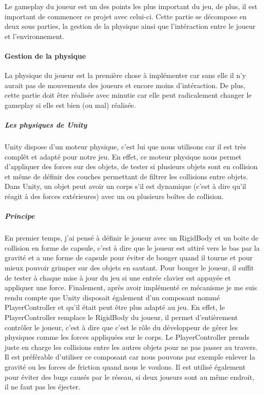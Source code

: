 \documentclass{article}
\begin{document}
Le gameplay du joueur est un des points les plus important du jeu, de plus, il est important de commencer ce projet avec celui-ci. Cette partie se décompose en deux sous parties, la gestion de la physique ainsi que l'intéraction entre le joueur et l'environnement.

\paragraph{Gestion de la physique}

La physique du joueur est la première chose à implémenter car sans elle il n'y aurait pas de mouvements des joueurs et encore moins d'intéraction.
De plus, cette partie doit être réalisée avec minutie car elle peut radicalement changer le gameplay si elle est bien (ou mal) réalisée.

\subparagraph{Les physiques de Unity}

Unity dispose d'un moteur physique, c'est lui que nous utilisons car il est très complêt et adapté pour notre jeu. En effet, ce moteur physique nous permet d'appliquer des forces sur des objets, de tester si plusieurs objets sont en collision et même de définir des couches permettant de filtrer les collisions entre objets. Dans Unity, un objet peut avoir un corps s'il est dynamique (c'est à dire qu'il réagit à des forces extérieures) avec un ou plusieurs boîtes de collision.

\subparagraph{Principe}

En premier temps, j'ai pensé à définir le joueur avec un RigidBody et un boite de collision en forme de capsule, c'est à dire que le joueur est attiré vers le bas par la gravité et a une forme de capsule pour éviter de bouger quand il tourne et pour mieux pouvoir grimper sur des objets en sautant. Pour bouger le joueur, il suffit de tester à chaque mise à jour du jeu si une entrée clavier est appuyée et appliquer une force. Finalement, après avoir implémenté ce mécanisme je me suis rendu compte que Unity disposait également d'un composant nommé PlayerController et qu'il était peut être plus adapté au jeu. En effet, le PlayerController remplace le RigidBody du joueur, il permet d'entièrement contrôler le joueur, c'est à dire que c'est le rôle du développeur de gérer les physiques comme les forces appliquées sur le corps. Le PlayerController prends juste en charge les collisions entre les autres objets pour ne pas passer au travers. Il est préférable d'utiliser ce composant car nous pouvons par exemple enlever la gravité ou les forces de friction quand nous le voulons. Il est utilisé également pour éviter des bugs causés par le réseau, si deux joueurs sont au même endroit, il ne faut pas les éjecter.
\end{document}
